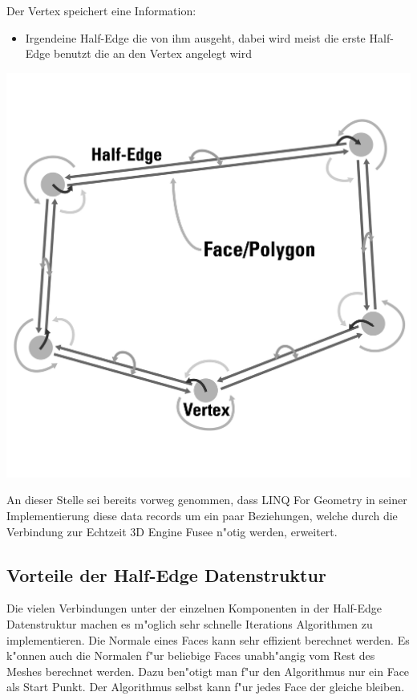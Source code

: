 \documentclass[pagesize, paper=a4, fontsize=12pt,titlepage=true, headings=small, headnosepline, abstractoff, liststotoc, nochapterprefix, plainheadsepline]{scrreprt}
\newcommand{\LFGS}{LINQ For Geometry }
\newcommand{\HES}{Half-Edge Datenstruktur }
\begin{document}
Der Vertex speichert eine Information:
\begin{itemize}
\item Irgendeine Half-Edge die von ihm ausgeht, dabei wird meist die erste Half-Edge benutzt die an den Vertex angelegt wird
\end{itemize}

\includegraphics[width=\linewidth]{../Bilder/hesBeziehungen}
\label{pic:polyConnections} 

An dieser Stelle sei bereits vorweg genommen, dass \LFGS in seiner Implementierung diese data records um ein paar Beziehungen, welche durch die Verbindung zur Echtzeit 3D Engine Fusee n"otig werden, erweitert.

		\subsection {Vorteile der \HES}
			Die vielen Verbindungen unter der einzelnen Komponenten in der \HES machen es m"oglich sehr schnelle Iterations Algorithmen zu implementieren. Die Normale eines Faces kann sehr effizient berechnet werden. Es k"onnen auch die Normalen f"ur beliebige Faces unabh"angig vom Rest des Meshes berechnet werden. Dazu ben"otigt man f"ur den Algorithmus nur ein Face als Start Punkt. Der Algorithmus selbst kann f"ur jedes Face der gleiche bleiben.
\end{document}

